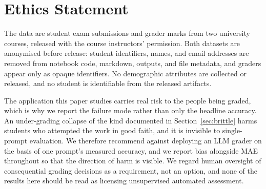 \section*{Ethics Statement}

The data are student exam submissions and grader marks from two university courses, released with the course instructors' permission. Both datasets are anonymised before release: student identifiers, names, and email addresses are removed from notebook code, markdown, outputs, and file metadata, and graders appear only as opaque identifiers. No demographic attributes are collected or released, and no student is identifiable from the released artifacts.

The application this paper studies carries real risk to the people being graded, which is why we report the failure mode rather than only the headline accuracy. An under-grading collapse of the kind documented in Section~\ref{sec:brittle} harms students who attempted the work in good faith, and it is invisible to single-prompt evaluation. We therefore recommend against deploying an LLM grader on the basis of one prompt's measured accuracy, and we report bias alongside MAE throughout so that the direction of harm is visible. We regard human oversight of consequential grading decisions as a requirement, not an option, and none of the results here should be read as licensing unsupervised automated assessment.
